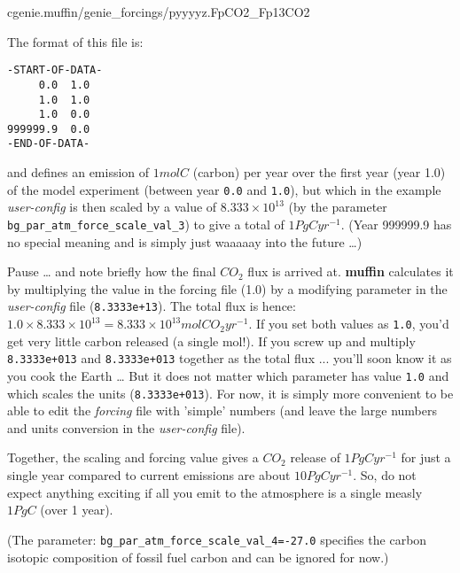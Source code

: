 \vspace{2pt}
\noindent \footnotesize\textsf{cgenie.muffin/genie\_forcings/pyyyyz.FpCO2\_Fp13CO2}\normalsize
\vspace{2pt}

\vspace{2pt}
\noindent The format of this file is:
\vspace{-2pt}\small\begin{verbatim}
-START-OF-DATA-
     0.0  1.0
     1.0  1.0
     1.0  0.0
999999.9  0.0
-END-OF-DATA-
\end{verbatim}\normalsize\vspace{-2pt}

\noindent and defines an emission of \(1 mol C\) (carbon) per year over the first year (year 1.0) of the model experiment (between year \texttt{0.0} and \texttt{1.0}), but which in the example \textit{user-config} is then scaled by a value of \(8.333\times10^{13}\) (by the parameter \texttt{bg\_par\_atm\_force\_scale\_val\_3}) to give a total of \(1 PgC yr^{-1}\). (Year 999999.9 has no special meaning and is simply just waaaaay into the future …)

\vspace{1mm}

Pause … and note briefly how the final \(CO_{2}\) flux is arrived at. \textbf{muffin} calculates it by multiplying the value in the forcing file (1.0) by a modifying parameter in the \textit{user-config} file (\texttt{8.3333e+13}). The total flux is hence: \(1.0 \times 8.333\times10^{13} = 8.333\times10^{13} mol CO_{2} yr^{-1}\). If you set both values as \texttt{1.0}, you’d get very little carbon released (a single mol!). If you screw up and multiply \texttt{8.3333e+013} and \texttt{8.3333e+013} together as the total flux ... you’ll soon know it as you cook the Earth … But it does not matter which parameter has value \texttt{1.0} and which scales the units (\texttt{8.3333e+013}). For now, it is simply more convenient to be able to edit the \textit{forcing} file with 'simple' numbers (and leave the large numbers and units conversion in the \textit{user-config} file).

Together, the scaling and forcing value gives a \(CO_{2}\) release of \(1 PgC yr^{-1}\) for just a single year compared to current emissions are about \(10 PgC yr^{-1}\). So, do not expect anything exciting if all you emit to the atmosphere is a single measly \(1 PgC\) (over 1 year).

(The parameter: \texttt{\small bg\_par\_atm\_force\_scale\_val\_4=-27.0} specifies the carbon isotopic composition of fossil fuel carbon and can be ignored for now.)

